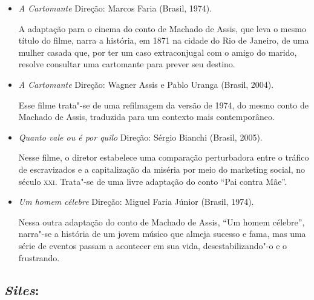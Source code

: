 \documentclass[11pt]{extarticle}
\begin{document}
\begin{itemize}


\item \textit{A Cartomante} Direção: Marcos Faria (Brasil, 1974).

A adaptação para o cinema do conto de Machado de Assis, que leva o mesmo título 
do filme, narra a história, em 1871 na cidade do Rio de Janeiro, de uma mulher casada que, 
por ter um caso extraconjugal com o amigo do marido, resolve consultar uma cartomante para 
prever seu destino.

\item \textit{A Cartomante} Direção: Wagner Assis e Pablo Uranga (Brasil, 2004).

Esse filme trata"-se de uma refilmagem da versão de 1974, do mesmo conto 
de Machado de Assis, traduzida para um contexto mais contemporâneo.

\item \textit{Quanto vale ou é por quilo} Direção: Sérgio Bianchi (Brasil, 2005).

Nesse filme, o diretor estabelece uma comparação perturbadora entre o
tráfico de escravizados e a capitalização da miséria por meio do
marketing social, no século \textsc{xxi}. Trata"-se de uma livre adaptação do
conto ``Pai contra Mãe''.

\item \textit{Um homem célebre} Direção: Miguel Faria Júnior (Brasil, 1974).

Nessa outra adaptação do conto de Machado de Assis, ``Um homem célebre'', narra"-se 
a história de um jovem músico que almeja sucesso e fama, mas uma série de eventos 
passam a acontecer em sua vida, desestabilizando"-o e o frustrando.

\end{itemize}

\subsection{\emph{Sites}:}
\end{document}
